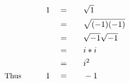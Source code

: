 \begin{alignat*}{5}
&\,&1\quad&=\quad&&\sqrt{1}\\
&\,&\,&=&&\sqrt{(-1)(-1)}\\
&\,&\,&=&&\sqrt{-1}\sqrt{-1}\\
&\,&\,&=&&i*i\\
&\,&\,&=&&i^2\\
&\small\text{Thus}\normalsize\qquad&1\quad&=&&-1
\end{alignat*}
